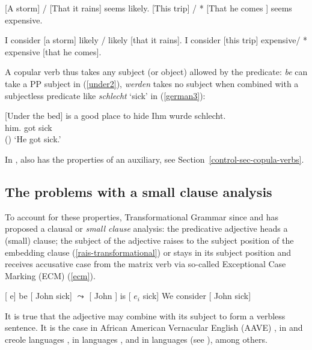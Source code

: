 \begin{exe}
\ex \label{storm}
\begin{xlist}
\ex{} [A storm] / [That it rains] seems likely.
\ex{} [This trip] / * [That he comes ] seems expensive.
\end{xlist}
\ex \begin{xlist}
\ex 	I consider [a storm] likely / likely [that it rains].
\ex 	I consider [this trip] expensive/ * expensive [that he comes].
\end{xlist}	
\end{exe}


A copular verb thus takes any subject (or object) allowed by the predicate: \emph{be} can take a PP
subject in  (\ref{under2}), \emph{werden} takes no subject when combined with a
subjectless predicate like \emph{schlecht} `sick' in  (\ref{german3}):

\eal
\ex{}[Under the bed] is a good place to hide \label{under2}
\ex
\label{german3} 
\gll Ihm        wurde schlecht.\footnotemark\\
     him.\DAT{} got   sick\\\hfill()
\glt `He got sick.'
\zl

 In ,  also has the properties of an auxiliary, see Section~\ref{control-sec-copula-verbs}.

\subsection{The problems with a small clause analysis}

To account for these properties, Transformational Grammar since \citet{Stowell1983}\addpages and
\citet{Chomsky1986}\addpages has proposed a clausal or \emph{small clause} analysis: the predicative
adjective heads a (small) clause; the subject of the adjective raises to the subject position of the
embedding clause (\ref{rais-transformational}) or stays in its subject position and receives accusative case from
the matrix verb via so-called Exceptional Case Marking (ECM) (\ref{ecm}).


\eal
\ex
\label{rais-transformational}
{}[ e] be [ John sick] $\leadsto$  [ John ] is  [ $e_{i}$ sick]
\ex
\label{ecm}
We consider [ John sick]
\zl

It is true that the adjective may combine with its subject to form a verbless sentence. It is the
case in African American Vernacular English (AAVE) \citep{Bender2001a}, in  \citep{Laurens2008} and creole languages
\citep{HenriandAbeille2007}, in  languages \citep{Zec87a-u}, and in  languages (see
\citealp{Alqurashi:Borsley:14}), among others. 

